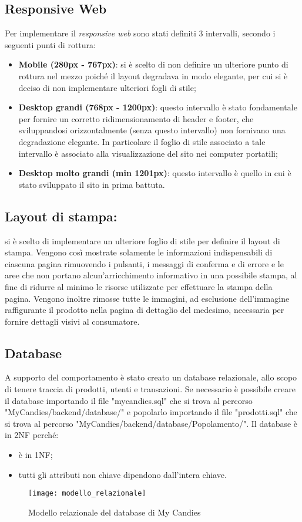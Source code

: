 \subsection{Responsive Web}
Per implementare il \textit{responsive web} sono stati definiti 3 intervalli, secondo i seguenti punti di rottura:
\begin{itemize}
    \item \textbf{Mobile (280px - 767px)}: si è scelto di non definire un ulteriore punto di rottura nel mezzo poiché  il layout degradava in modo elegante, per cui si è deciso di non implementare ulteriori fogli di stile;
    \item \textbf{Desktop grandi (768px - 1200px)}: questo intervallo è stato fondamentale per fornire un corretto ridimensionamento di header e footer, che sviluppandosi orizzontalmente (senza questo intervallo) non fornivano una degradazione elegante. In particolare il foglio di stile associato a tale intervallo è associato alla visualizzazione del sito nei computer portatili;
    \item \textbf{Desktop molto grandi (min 1201px)}: questo intervallo è quello in cui è stato sviluppato il sito in prima battuta. 
\end{itemize}

\subsection{Layout di stampa:} si è scelto di implementare un ulteriore foglio di stile per definire il layout di stampa. Vengono così mostrate solamente le informazioni indispensabili di ciascuna pagina rimuovendo i pulsanti, i messaggi di conferma e di errore e le aree che non portano alcun'arricchimento informativo in una possibile stampa, al fine di ridurre al minimo le risorse utilizzate per effettuare la stampa della pagina. Vengono inoltre rimosse tutte le immagini, ad esclusione dell'immagine raffigurante il prodotto nella pagina di dettaglio del medesimo, necessaria per fornire dettagli visivi al consumatore.

\subsection{Database}
A supporto del comportamento è stato creato un database relazionale, allo scopo di tenere traccia di prodotti, utenti e transazioni. Se necessario è possibile creare il database importando il file "mycandies.sql" che si trova al percorso "MyCandies/backend/database/" e popolarlo importando il file "prodotti.sql" che si trova al percorso "MyCandies/backend/database/Popolamento/". Il database è in 2NF perché:
\begin{itemize}
    \item è in 1NF;
    \item tutti gli attributi non chiave dipendono dall'intera chiave.
\end{itemize}
\begin{figure}[H]
\centering
\texttt{[image: modello\_relazionale]}
\caption{Modello relazionale del database di My Candies} 
\end{figure}

